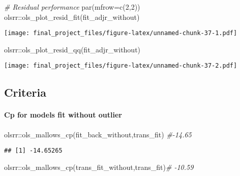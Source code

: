 \documentclass[
]{article}
\newenvironment{Shaded}{\begin{snugshade}}{\end{snugshade}}
\newcommand{\AttributeTok}[1]{\textcolor[rgb]{0.77,0.63,0.00}{#1}}
\newcommand{\CommentTok}[1]{\textcolor[rgb]{0.56,0.35,0.01}{\textit{#1}}}
\newcommand{\DecValTok}[1]{\textcolor[rgb]{0.00,0.00,0.81}{#1}}
\newcommand{\FunctionTok}[1]{\textcolor[rgb]{0.00,0.00,0.00}{#1}}
\newcommand{\NormalTok}[1]{#1}
\newcommand{\SpecialCharTok}[1]{\textcolor[rgb]{0.00,0.00,0.00}{#1}}
\begin{document}
\begin{Shaded}
\begin{Highlighting}[]
\CommentTok{\# Residual performance}
\FunctionTok{par}\NormalTok{(}\AttributeTok{mfrow=}\FunctionTok{c}\NormalTok{(}\DecValTok{2}\NormalTok{,}\DecValTok{2}\NormalTok{))}
\NormalTok{olsrr}\SpecialCharTok{::}\FunctionTok{ols\_plot\_resid\_fit}\NormalTok{(fit\_adjr\_without)}
\end{Highlighting}
\end{Shaded}

\texttt{[image: final\_project\_files/figure-latex/unnamed-chunk-37-1.pdf]}

\begin{Shaded}
\begin{Highlighting}[]
\NormalTok{olsrr}\SpecialCharTok{::}\FunctionTok{ols\_plot\_resid\_qq}\NormalTok{(fit\_adjr\_without)}
\end{Highlighting}
\end{Shaded}

\texttt{[image: final\_project\_files/figure-latex/unnamed-chunk-37-2.pdf]}

\hypertarget{criteria}{%
\subsection{Criteria}\label{criteria}}

\hypertarget{cp-for-models-fit-without-outlier}{%
\paragraph{Cp for models fit without
outlier}\label{cp-for-models-fit-without-outlier}}

\begin{Shaded}
\begin{Highlighting}[]
\NormalTok{olsrr}\SpecialCharTok{::}\FunctionTok{ols\_mallows\_cp}\NormalTok{(fit\_back\_without,trans\_fit) }\CommentTok{\#{-}14.65}
\end{Highlighting}
\end{Shaded}

\begin{verbatim}
## [1] -14.65265
\end{verbatim}

\begin{Shaded}
\begin{Highlighting}[]
\NormalTok{olsrr}\SpecialCharTok{::}\FunctionTok{ols\_mallows\_cp}\NormalTok{(trans\_fit\_without,trans\_fit)}\CommentTok{\# {-}10.59}
\end{Highlighting}
\end{Shaded}
\end{document}
